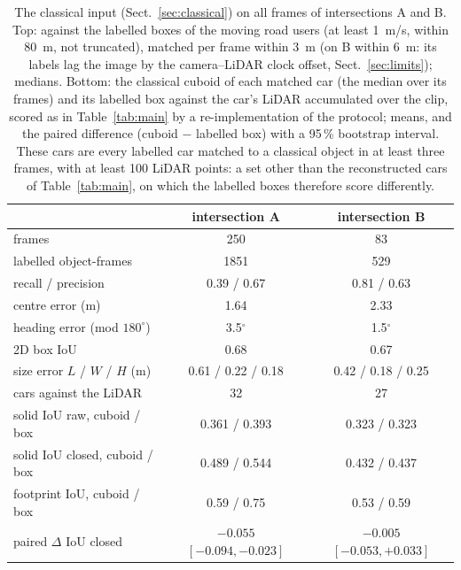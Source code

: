 \begin{table}[t]
\centering
\caption{The classical input (Sect.~\ref{sec:classical}) on all frames of intersections A and B. Top: against the labelled boxes of the moving road users (at least 1~m/s, within 80~m, not truncated), matched per frame within 3~m (on B within 6~m: its labels lag the image by the camera--LiDAR clock offset, Sect.~\ref{sec:limits}); medians. Bottom: the classical cuboid of each matched car (the median over its frames) and its labelled box against the car's LiDAR accumulated over the clip, scored as in Table~\ref{tab:main} by a re-implementation of the protocol; means, and the paired difference (cuboid $-$ labelled box) with a 95\,\% bootstrap interval. These cars are every labelled car matched to a classical object in at least three frames, with at least 100 LiDAR points: a set other than the reconstructed cars of Table~\ref{tab:main}, on which the labelled boxes therefore score differently.}
\label{tab:classical}
\small
\setlength{\tabcolsep}{4pt}
\begin{tabular}{lcc}
\toprule
 & intersection A & intersection B \\
\midrule
frames & 250 & 83 \\
labelled object-frames & 1851 & 529 \\
recall / precision & 0.39 / 0.67 & 0.81 / 0.63 \\
centre error (m) & 1.64 & 2.33 \\
heading error (mod $180^\circ$) & 3.5$^\circ$ & 1.5$^\circ$ \\
2D box IoU & 0.68 & 0.67 \\
size error $L$ / $W$ / $H$ (m) & 0.61 / 0.22 / 0.18 & 0.42 / 0.18 / 0.25 \\
\midrule
cars against the LiDAR & 32 & 27 \\
solid IoU raw, cuboid / box & 0.361 / 0.393 & 0.323 / 0.323 \\
solid IoU closed, cuboid / box & 0.489 / 0.544 & 0.432 / 0.437 \\
footprint IoU, cuboid / box & 0.59 / 0.75 & 0.53 / 0.59 \\
paired $\Delta$ IoU closed & $-0.055$ $[-0.094, -0.023]$ & $-0.005$ $[-0.053, +0.033]$ \\
\bottomrule
\end{tabular}
\end{table}
